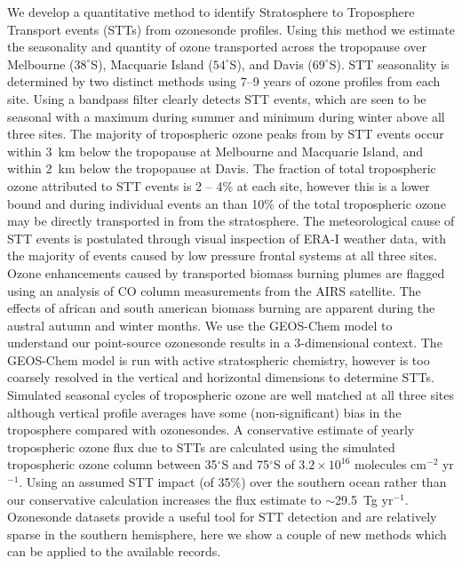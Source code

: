   We develop a quantitative method to identify Stratosphere to Troposphere Transport events (STTs) from ozonesonde profiles. 
  Using this method we estimate the seasonality and quantity of ozone transported across the tropopause over Melbourne ($38^\circ$S), Macquarie Island ($54^\circ$S), and Davis ($69^\circ$S).
  STT seasonality is determined by two distinct methods using 7--9 years of ozone profiles from each site.
  Using a bandpass filter clearly detects STT events, which are seen to be seasonal with a maximum during summer and minimum during winter above all three sites.
  The majority of tropospheric ozone peaks from by STT events occur within 3~km below the tropopause at Melbourne and Macquarie Island, and within 2~km below the tropopause at Davis.
  The fraction of total tropospheric ozone attributed to STT events is 2 – 4\% at each site, however this is a lower bound and during individual events an than 10\% of the total tropospheric ozone may be directly transported in from the stratosphere.
  The meteorological cause of STT events is postulated through visual inspection of ERA-I weather data, with the majority of events caused by low pressure frontal systems at all three sites.
  Ozone enhancements caused by transported biomass burning plumes are flagged using an analysis of CO column measurements from the AIRS satellite.
  The effects of african and south american biomass burning are apparent during the austral autumn and winter months.
  We use the GEOS-Chem model to understand our point-source ozonesonde results in a 3-dimensional context.
  The GEOS-Chem model is run with active stratospheric chemistry, however is too coarsely resolved in the vertical and horizontal dimensions to determine STTs.
  Simulated seasonal cycles of tropospheric ozone are well matched at all three sites although vertical profile averages have some (non-significant) bias in the troposphere compared with ozonesondes.
  A conservative estimate of yearly tropospheric ozone flux due to STTs are calculated using the simulated tropospheric ozone column between 35$^\circ$S and 75$^\circ$S of $3.2\times10^{16}$ molecules cm$^{-2}$ yr$^{-1}$.
  Using an assumed STT impact (of 35\%) over the southern ocean rather than our conservative calculation increases the flux estimate to $\sim$29.5~Tg yr$^{-1}$.
  Ozonesonde datasets provide a useful tool for STT detection and are relatively sparse in the southern hemisphere, here we show a couple of new methods which can be applied to the available records.
  